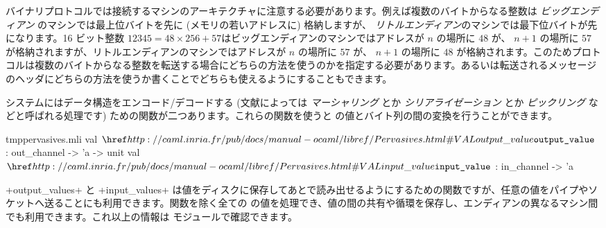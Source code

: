 バイナリプロトコルでは接続するマシンのアーキテクチャに注意する必要があります。例えば複数のバイトからなる整数は \emph{ビッグエンディアン} のマシンでは最上位バイトを先に (メモリの若いアドレスに) 格納しますが、 \emph{リトルエンディアン}のマシンでは最下位バイトが先になります。16 ビット整数 $12345 = 48 \times 256 + 57$はビッグエンディアンのマシンではアドレスが $n$ の場所に $48$ が、 $n+1$ の場所に $57$ が格納されますが、リトルエンディアンのマシンではアドレスが $n$ の場所に $57$ が、 $n+1$ の場所に $48$ が格納されます。このためプロトコルは複数のバイトからなる整数を転送する場合にどちらの方法を使うのかを指定する必要があります。あるいは転送されるメッセージのヘッダにどちらの方法を使うか書くことでどちらも使えるようにすることもできます。

\ocaml システムにはデータ構造をエンコード/デコードする (文献によっては \emph{マーシャリング} とか \emph{シリアライゼーション} とか \emph{ピックリング} などと呼ばれる処理です) ための関数が二つあります。これらの関数を使うと \ocaml の値とバイト列の間の変換を行うことができます。
%
\begin{listingcodefile}{tmppervasives.mli}
val $\indexlibvalue{Pervasives}{output\_value}$ : out_channel -> 'a -> unit
val $\indexlibvalue{Pervasives}{input\_value}$ : in_channel -> 'a
\end{listingcodefile}
%
\ml+output_values+ と \ml+input_values+ は値をディスクに保存してあとで読み出せるようにするための関数ですが、任意の値をパイプやソケットへ送ることにも利用できます。関数を除く全ての \ocaml の値を処理でき、値の間の共有や循環を保存し、エンディアンの異なるマシン間でも利用できます。これ以上の情報は  モジュールで確認できます。

